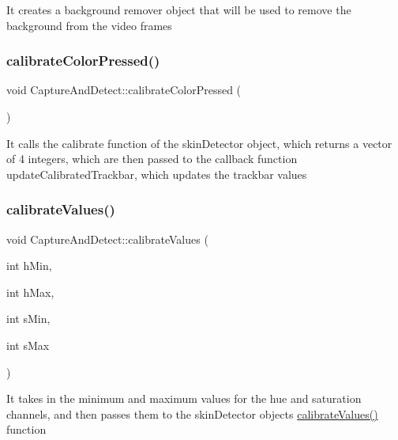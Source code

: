 It creates a background remover object that will be used to remove the background from the video frames \mbox{\label{classGestro_1_1CaptureAndDetect_ac60f9b1d192c043fa9b40c38fc5599e6}} 
\subsubsection{\texorpdfstring{calibrate\+Color\+Pressed()}{calibrateColorPressed()}}
{\footnotesize\ttfamily void Capture\+And\+Detect\+::calibrate\+Color\+Pressed (\begin{DoxyParamCaption}{ }\end{DoxyParamCaption})}

It calls the calibrate function of the skin\+Detector object, which returns a vector of 4 integers, which are then passed to the callback function update\+Calibrated\+Trackbar, which updates the trackbar values \mbox{\label{classGestro_1_1CaptureAndDetect_aafb4f601f860dd38f514f6dd29a1d016}} 
\subsubsection{\texorpdfstring{calibrate\+Values()}{calibrateValues()}}
{\footnotesize\ttfamily void Capture\+And\+Detect\+::calibrate\+Values (\begin{DoxyParamCaption}\item[{int}]{h\+Min,  }\item[{int}]{h\+Max,  }\item[{int}]{s\+Min,  }\item[{int}]{s\+Max }\end{DoxyParamCaption})}

It takes in the minimum and maximum values for the hue and saturation channels, and then passes them to the skin\+Detector object\textquotesingle{}s \hyperlink{classGestro_1_1CaptureAndDetect_aafb4f601f860dd38f514f6dd29a1d016}{calibrate\+Values()} function


